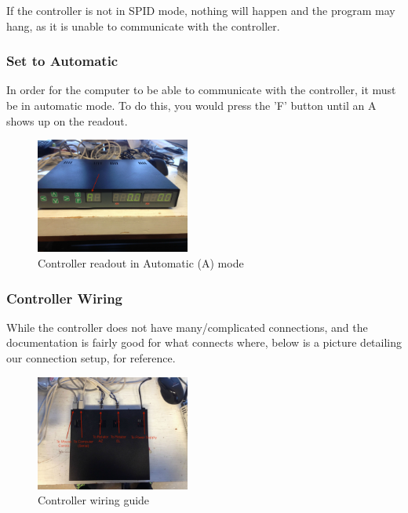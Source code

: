 \documentclass[11pt]{article} %
\begin{document}
If the controller is not in SPID mode, nothing will happen and the program may hang, as it is unable to communicate with the controller.

\subsubsection{Set to Automatic}

In order for the computer to be able to communicate with the controller, it must be in automatic mode. To do this, you would press the 'F' button until an A shows up on the readout. 

\begin{figure}
  \centering
  \caption{Controller readout in Automatic (A) mode}
  \includegraphics[width=0.45\textwidth]{controller/03.jpeg}
\end{figure}

\subsubsection{Controller Wiring}

While the controller does not have many/complicated connections, and the documentation is fairly good for what connects where, below is a picture detailing our connection setup, for reference.

\begin{figure}
  \centering
  \caption{Controller wiring guide}
  \includegraphics[width=0.45\textwidth]{controller/04.jpeg}
\end{figure}


\newpage
\end{document}
